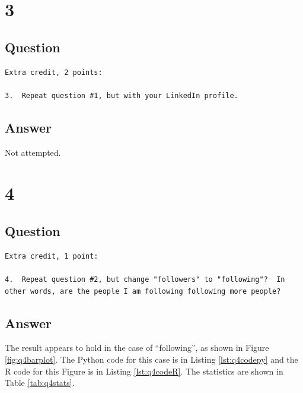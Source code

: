 \documentclass[letterpaper,11pt]{article}
\begin{document}
\newpage




\newpage
\section*{3}

\subsection*{Question}

\begin{verbatim}
Extra credit, 2 points:

3.  Repeat question #1, but with your LinkedIn profile.
\end{verbatim}

\newpage
\subsection*{Answer}

Not attempted.

\newpage
\section*{4}

\subsection*{Question}

\begin{verbatim}
Extra credit, 1 point:

4.  Repeat question #2, but change "followers" to "following"?  In
other words, are the people I am following following more people?
\end{verbatim}

\newpage
\subsection*{Answer}

The result appears to hold in the case of ``following'', as shown in Figure \ref{fig:q4barplot}.  The Python code for this case is in Listing \ref{lst:q4codepy} and the R code for this Figure is in Listing \ref{lst:q4codeR}.  The statistics are shown in Table \ref{tab:q4stats}.
\end{document}
